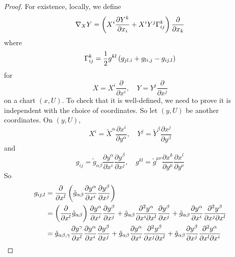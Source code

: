 \begin{enumerate}[label=\arabic{*}.]
\begin{proof}
		\noindent For existence, locally, we define
		\begin{equation*}
			\nabla_XY = \left(X^i\frac{\partial Y^k}{\partial x_i}+X^iY^j\Gamma^k_{ij}\right)\frac{\partial}{\partial x_k}
		\end{equation*}
		where
		\begin{equation*}
			\Gamma^k_{ij} = \frac{1}{2}g^{kl}\left(g_{jl,i}+g_{li,j}-g_{ij,l}\right)
		\end{equation*}
		for 
		\begin{equation*}
			X=X^i\frac{\partial}{\partial x^i},\quad Y=Y^j\frac{\partial}{\partial x^j}
		\end{equation*}
		on a chart $(x,U)$. To check that it is well-defined, we need to prove it is independent with the choice of coordinates. So let $(y,U)$ be another coordinates. On $(y,U)$,
		\begin{equation*}
			X^i = \tilde{X}^\alpha\frac{\partial x^i}{\partial y^\alpha},\quad Y^j = \tilde{Y}^\beta\frac{\partial x^j}{\partial y^\beta}
		\end{equation*}
		and
		\begin{equation*}
			g_{ij} = \tilde{g}_{\alpha\beta}\frac{\partial y^\alpha}{\partial x^i}\frac{\partial y^\beta}{\partial x^j},\quad g^{kl} = \tilde{g}^{\mu\nu}\frac{\partial x^k}{\partial y^\mu}\frac{\partial x^l}{\partial y^\nu}
		\end{equation*}
		So
		\begin{equation*}
			\begin{aligned}
				g_{ij,l} &= \frac{\partial}{\partial x^l}\left(\tilde{g}_{\alpha\beta}\frac{\partial y^\alpha}{\partial x^i}\frac{\partial y^\beta}{\partial x^j}\right) \\
				&= \left(\frac{\partial}{\partial x^l}\tilde{g}_{\alpha\beta}\right)\frac{\partial y^\alpha}{\partial x^i}\frac{\partial y^\beta}{\partial x^j} + \tilde{g}_{\alpha\beta}\frac{\partial^2 y^\alpha}{\partial x^i\partial x^l}\frac{\partial y^\beta}{\partial x^j} + \tilde{g}_{\alpha\beta}\frac{\partial y^\alpha}{\partial x^i}\frac{\partial^2 y^\beta}{\partial x^j\partial x^l} \\
				&=\tilde{g}_{\alpha\beta,\gamma}\frac{\partial y^\gamma}{\partial x^l}\frac{\partial y^\alpha}{\partial x^i}\frac{\partial y^\beta}{\partial x^j} + \tilde{g}_{\alpha\beta}\frac{\partial y^\alpha}{\partial x^i}\frac{\partial^2 y^\beta}{\partial x^j\partial x^l} + \tilde{g}_{\alpha\beta}\frac{\partial y^\beta}{\partial x^j}\frac{\partial^2 y^\alpha}{\partial x^l\partial x^i}
			\end{aligned}
		\end{equation*}

\end{proof}
\end{enumerate}
